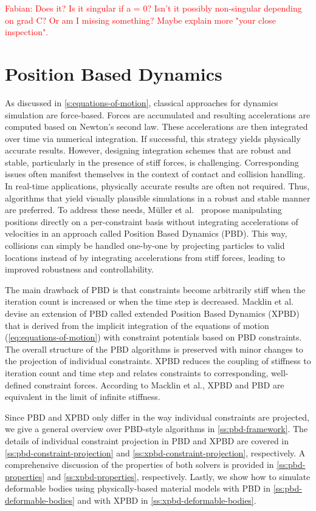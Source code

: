 \textcolor{red}{Fabian: Does it? Is it singular if a = 0? Isn't it possibly non-singular depending on grad C? Or am I missing something? 
Maybe explain more "your close inspection".}

\section{Position Based Dynamics}\label{s:pbd}
As discussed in \cref{s:equations-of-motion}, classical approaches for dynamics simulation are force-based. Forces are accumulated and 
resulting accelerations are computed based on Newton's second law. These accelerations are then integrated over time via numerical integration. 
If successful, this strategy yields physically accurate results. However, designing integration schemes that are robust and stable,
particularly in the presence of stiff forces, is challenging. Corresponding issues often manifest themselves in the context of contact and collision 
handling. In real-time applications, physically accurate results are often not required. Thus, algorithms that yield visually
plausible simulations in a robust and stable manner are preferred. To address these needs, Müller et al.\ \cite{mueller2006} propose manipulating
positions directly on a per-constraint basis without integrating accelerations of velocities in an approach called Position Based Dynamics (PBD).
This way, collisions can simply be handled one-by-one by projecting particles to valid locations instead of by integrating accelerations from 
stiff forces, leading to improved robustness and controllability. 

The main drawback of PBD is that constraints become arbitrarily stiff when the iteration count is increased or when the time step is decreased.
Macklin et al.\ \cite{macklin2016} devise an extension of PBD called extended Position Based Dynamics (XPBD) that is derived from the implicit
integration of the equations of motion (\cref{eq:equations-of-motion}) with constraint potentials based on PBD constraints. The overall structure 
of the PBD algorithms is preserved with 
minor changes to the projection of individual constraints. XPBD reduces the coupling of stiffness to iteration count and time step and relates 
constraints to corresponding, well-defined constraint forces. According to Macklin et al., XPBD and PBD are equivalent in the limit of infinite
stiffness. 

Since PBD and XPBD only differ in the way individual constraints are projected, we give a general overview over PBD-style algorithms 
in \cref{ss:pbd-framework}. 
The details of individual constraint projection in PBD and XPBD are covered in \cref{ss:pbd-constraint-projection} and 
\cref{ss:xpbd-constraint-projection}, respectively. A comprehensive discussion of the properties of both solvers is provided in 
\cref{ss:pbd-properties} and \cref{ss:xpbd-properties}, respectively. Lastly, we show how to simulate deformable bodies using physically-based 
material models with PBD in \cref{ss:pbd-deformable-bodies} and with XPBD in \cref{ss:xpbd-deformable-bodies}.

